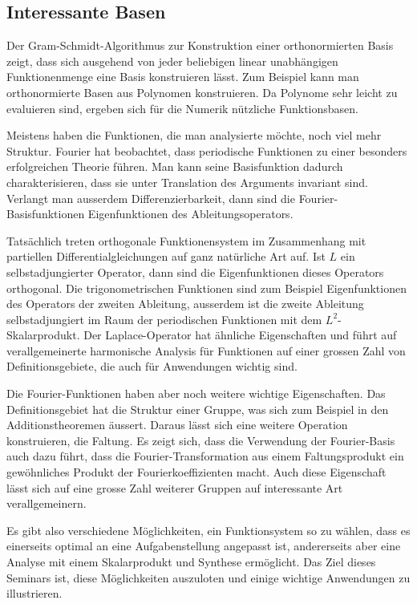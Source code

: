 %
%
\subsection{Interessante Basen}
Der Gram-Schmidt-Algorithmus zur Konstruktion einer orthonormierten
Basis zeigt, dass sich ausgehend von jeder beliebigen linear
unabhängigen Funktionenmenge eine Basis konstruieren lässt.
Zum Beispiel kann man orthonormierte Basen aus Polynomen konstruieren.
Da Polynome sehr leicht zu evaluieren sind, ergeben sich für die
Numerik nützliche Funktionsbasen.

Meistens haben die Funktionen, die man analysierte möchte, noch
viel mehr Struktur.
Fourier hat beobachtet, dass periodische Funktionen zu einer
%
besonders erfolgreichen Theorie führen.
Man kann seine Basisfunktion dadurch charakterisieren, dass sie
unter Translation des Arguments invariant sind.
Verlangt man ausserdem Differenzierbarkeit, dann sind die
Fourier-Basisfunktionen Eigenfunktionen des Ableitungsoperators.

Tatsächlich treten orthogonale Funktionensystem im Zusammenhang
mit partiellen Differentialgleichungen auf ganz natürliche Art auf.
Ist $L$ ein selbstadjungierter Operator, dann sind die Eigenfunktionen
dieses Operators orthogonal.
Die trigonometrischen Funktionen sind zum Beispiel Eigenfunktionen
des Operators der zweiten Ableitung, ausserdem ist die zweite
Ableitung selbstadjungiert im Raum der periodischen Funktionen
mit dem $L^2$-Skalarprodukt.
Der Laplace-Operator hat ähnliche Eigenschaften und führt
auf verallgemeinerte harmonische Analysis für Funktionen auf
einer grossen Zahl von Definitionsgebiete, die auch für
Anwendungen wichtig sind.

Die Fourier-Funktionen haben aber noch weitere wichtige Eigenschaften.
Das Definitionsgebiet hat die Struktur einer Gruppe, was sich zum
%
Beispiel in den Additionstheoremen äussert.
Daraus lässt sich eine weitere Operation konstruieren, die Faltung.
%
Es zeigt sich, dass die Verwendung der Fourier-Basis auch dazu führt,
dass die Fourier-Transformation aus einem Faltungsprodukt ein gewöhnliches
%
Produkt der Fourierkoeffizienten macht.
Auch diese Eigenschaft lässt sich auf eine grosse Zahl weiterer
Gruppen auf interessante Art verallgemeinern.

Es gibt also verschiedene Möglichkeiten, ein Funktionsystem so
zu wählen, dass es einerseits optimal an eine Aufgabenstellung
angepasst ist, andererseits aber eine Analyse mit einem Skalarprodukt
und Synthese ermöglicht.
Das Ziel dieses Seminars ist, diese Möglichkeiten auszuloten
und einige wichtige Anwendungen zu illustrieren.




